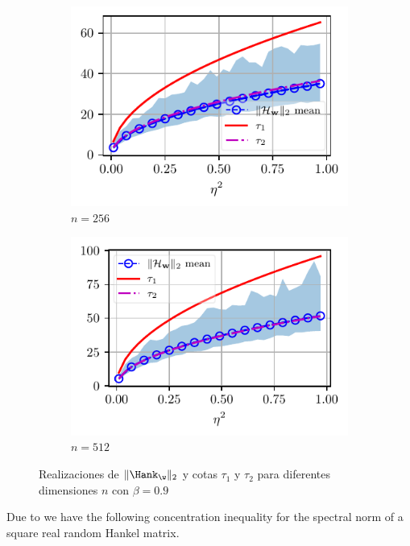 \begin{figure}[t]
\begin{subfigure}{0.4\linewidth}
			\includegraphics[width = \linewidth]{Figuras/taus_N_256_beta_0.9.pdf}
			\caption{$n = 256$}
		\end{subfigure}
		\begin{subfigure}{0.4\linewidth}
			\centering
			\includegraphics[width = \linewidth]{Figuras/taus_N_512_beta_0.9.pdf}
			\caption{$n = 512$}
		\end{subfigure}
		\caption{Realizaciones de $\|\Hank_\w\|_2$ y cotas $\tau_1$ y $\tau_2$ para diferentes dimensiones $n$ con $\beta = 0.9$}
		\label{fig:taus11}
	\end{figure}

\newpage




	Due to \cite{tropp2015} we have the following concentration inequality for the spectral norm of a square real random Hankel matrix.

